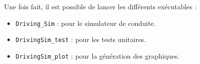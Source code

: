 \noindent
Une fois fait, il est possible de lancer les différents exécutables :
\begin{itemize}
    \item \texttt{Driving\_Sim} : pour le simulateur de conduite.
    \item \texttt{DrivingSim\_test} : pour les tests unitaires.
    \item \texttt{DrivingSim\_plot} : pour la génération des graphiques.
\end{itemize}
